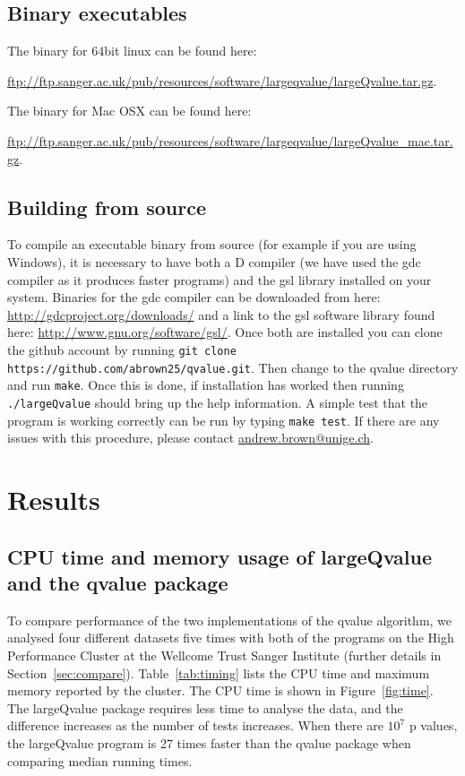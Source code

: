 \documentclass{amsart}
\begin{document}
\subsection{Binary executables}

The binary for 64bit linux can be found here:

\noindent \url{ftp://ftp.sanger.ac.uk/pub/resources/software/largeqvalue/largeQvalue.tar.gz}.

\noindent The binary for Mac OSX can be found here:

\noindent \url{ftp://ftp.sanger.ac.uk/pub/resources/software/largeqvalue/largeQvalue_mac.tar.gz}.

\subsection{Building from source}

To compile an executable binary from source (for example if you are using Windows), it is necessary to have both a D compiler (we have used the gdc compiler as it produces faster programs) and the gsl library installed on your system. Binaries for the gdc compiler can be downloaded from here: \url{http://gdcproject.org/downloads/} and a link to the gsl software library found here: \url{http://www.gnu.org/software/gsl/}. Once both are installed you can clone the github account by running \texttt{git clone https://github.com/abrown25/qvalue.git}. Then change to the qvalue directory and run \texttt{make}. Once this is done, if installation has worked then running \texttt{./largeQvalue} should bring up the help information. A simple test that the program is working correctly can be run by typing \texttt{make test}. If there are any issues with this procedure, please contact \href{mailto:andrew.brown@unige.ch}{andrew.brown@unige.ch}.

\section{Results}


\subsection{CPU time and memory usage of largeQvalue and the qvalue package}

\noindent To compare performance of the two implementations of the qvalue algorithm, we analysed four different datasets five times with both of the programs on the High Performance Cluster at the Wellcome Trust Sanger Institute (further details in Section~\ref{sec:compare}). Table~\ref{tab:timing} lists the CPU time and maximum memory reported by the cluster. The CPU time is shown in Figure~\ref{fig:time}. The largeQvalue package requires less time to analyse the data, and the difference increases as the number of tests increases. When there are $10^7$ p values, the largeQvalue program is 27 times faster than the qvalue package when comparing median running times.
\end{document}
